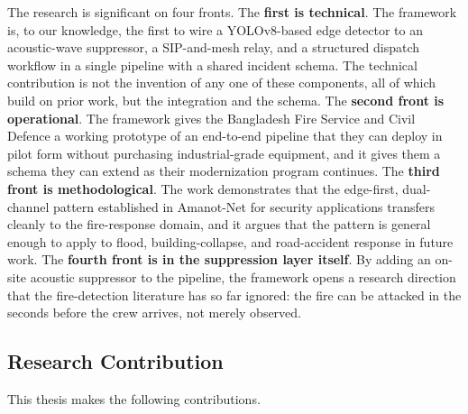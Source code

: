 The research is significant on four fronts. The \textbf{first is technical}. The framework is, to our knowledge, the first to wire a YOLOv8-based edge detector to an acoustic-wave suppressor, a SIP-and-mesh relay, and a structured dispatch workflow in a single pipeline with a shared incident schema. The technical contribution is not the invention of any one of these components, all of which build on prior work, but the integration and the schema. The \textbf{second front is operational}. The framework gives the Bangladesh Fire Service and Civil Defence a working prototype of an end-to-end pipeline that they can deploy in pilot form without purchasing industrial-grade equipment, and it gives them a schema they can extend as their modernization program continues. The \textbf{third front is methodological}. The work demonstrates that the edge-first, dual-channel pattern established in Amanot-Net for security applications transfers cleanly to the fire-response domain, and it argues that the pattern is general enough to apply to flood, building-collapse, and road-accident response in future work. The \textbf{fourth front is in the suppression layer itself}. By adding an on-site acoustic suppressor to the pipeline, the framework opens a research direction that the fire-detection literature has so far ignored: the fire can be attacked in the seconds before the crew arrives, not merely observed.

\subsection{Research Contribution}

This thesis makes the following contributions.

